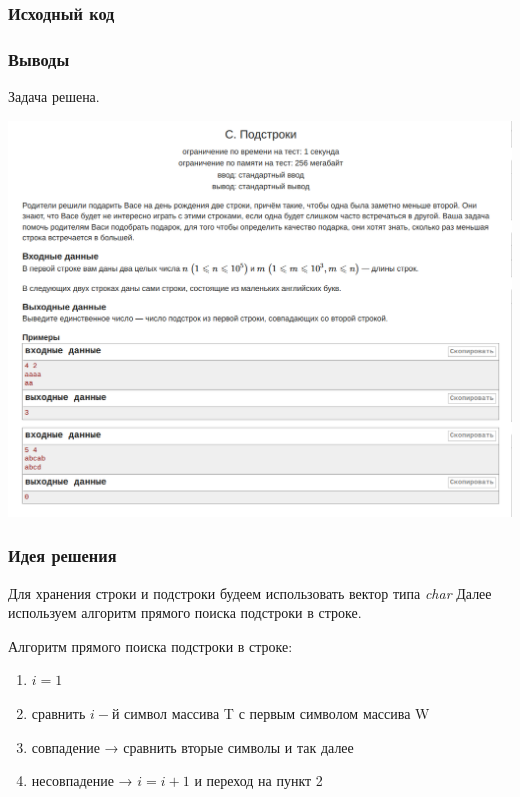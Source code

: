 \subsubsection*{Исходный код}


\subsubsection*{Выводы}
Задача решена.

\begin{center}
\includegraphics[width=\textwidth]{statements/Contest1C.png}
\end{center}

\subsubsection*{Идея решения}

Для хранения строки и подстроки будеем использовать вектор типа \textit{char}
Далее используем алгоритм прямого поиска подстроки в строке.


Алгоритм прямого поиска подстроки в строке:
\begin{enumerate}
    \item $i = 1$
    \item сравнить $i-й$ символ массива T с первым символом массива W
    \item совпадение → сравнить вторые символы и так далее
    \item несовпадение → $i = i+1$ и переход на пункт 2
\end{enumerate}

